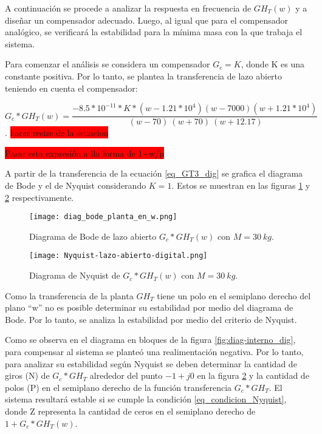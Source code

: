  A continuación se procede a analizar la respuesta en frecuencia de $GH_{T}(w)$ y a diseñar un compensador adecuado. Luego, al igual que para el compensador analógico, se verificará la estabilidad para la mínima masa  con la  que trabaja el sistema.
 
Para comenzar el análisis se considera un compensador $G_c=K$, donde K es una constante positiva. Por lo tanto, se plantea la transferencia de lazo abierto teniendo en cuenta el compensador:
 
 \begin{equation} \label{eq_GT3_dig}
 	G_c*GH_T(w)=\frac{-8.5*10^{-11}*K*(w-1.21*10^4)(w-7000)(w+1.21*10^4)}{\ (w-70)\ (w+70)\ (w+12.17)} 
 \end{equation}.
\colorbox{red}{hacer resize de la ecuacion}

\colorbox{red}{Pasar esta expresión a lla forma de 1+w/p}

 A partir de la transferencia de la ecuación  \ref{eq_GT3_dig} se  grafica el diagrama de Bode y el de Nyquist considerando $K=1$. Estos se muestran en las figuras \ref{fig:bode_digital} y \ref{fig:nyquist-lazo-abierto-digital} respectivamente.

\begin{figure}[H]
	\centering
	\texttt{[image: diag\_bode\_planta\_en\_w.png]}
	\caption{Diagrama de Bode de lazo abierto $G_c*GH_{T}(w)$ con $M=30\:kg$.}
	\label{fig:bode_digital}
\end{figure}

\begin{figure}[H]
	\centering
	\texttt{[image: Nyquist-lazo-abierto-digital.png]}
	\caption{Diagrama de Nyquist de $G_c*GH_{T}(w)$ con $M=30\:kg$.}
	\label{fig:nyquist-lazo-abierto-digital}
\end{figure}

Como la transferencia de la planta $GH_T$ tiene un polo en el semiplano derecho del plano ``w'' no es posible determinar su estabilidad por medio del diagrama de Bode. Por lo tanto, se analiza la estabilidad por medio del criterio de Nyquist.

Como se observa en el diagrama en bloques de la figura \ref{fig:diag-interno_dig}, para compensar al sistema se planteó una realimentación negativa. Por lo tanto, para analizar su estabilidad según Nyquist se deben determinar la cantidad de giros (N) de $G_c*GH_T$ alrededor del punto $-1+j0$ en la figura \ref{fig:nyquist-lazo-abierto-digital} y la cantidad de polos (P) en el semiplano derecho de la función transferencia $G_c*GH_T$. El sistema resultará estable si se cumple la condición \ref{eq_condicion_Nyquist}, donde Z representa la cantidad de ceros en el semiplano derecho de $1+G_c*GH_T(w)$.

